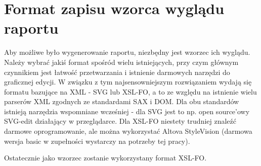 \documentclass[11pt,a4paper]{article}
\begin{document}
\section{Format zapisu wzorca wyglądu raportu}\label{sec:formatywzorce}
Aby możliwe było wygenerowanie raportu, niezbędny jest wzorzec ich wyglądu. Należy wybrać jakiś format spośród wielu istniejących, przy czym głównym czynnikiem jest łatwość przetwarzania i istnienie darmowych narzędzi do graficznej edycji. W związku z tym najsensowniejszym rozwiązaniem wydają się formatu bazujące na XML - SVG lub XSL-FO, a to ze względu na istnienie wielu parserów XML zgodnych ze standardami SAX i DOM. Dla obu standardów istnieją narzędzia wspomniane wcześniej - dla SVG jest to np. open source'owy SVG-edit działający w przeglądarce. Dla XSL-FO niestety trudniej znaleźć darmowe oprogramowanie, ale można wykorzystać Altova StyleVision (darmowa wersja basic w zupełności wystarczy na potrzeby tej pracy). 

Ostatecznie jako wzorzec zostanie wykorzystany format XSL-FO.



 
\end{document}
